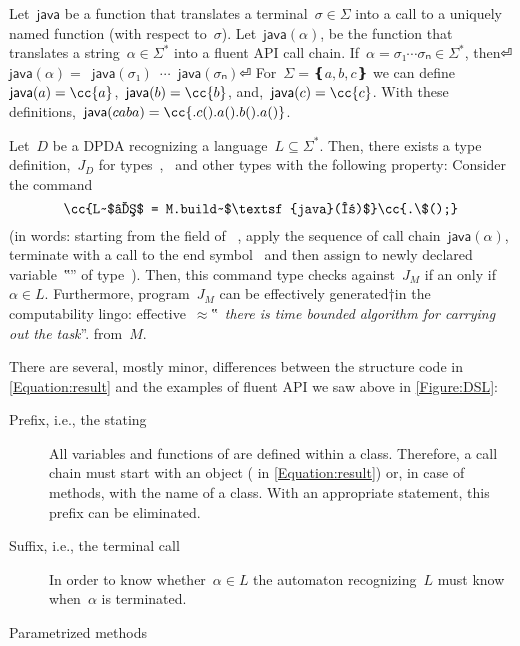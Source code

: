 Let~$\textsf{java}$ be a function that translates a terminal~$σ∈Σ$
into a call to a uniquely named function (with respect to~$σ$).
Let~$\textsf{java}(α)$, be the function
  that translates a string~$α∈Σ^*$ into a fluent API call chain.
If~$α=σ₁⋯σₙ∈Σ^*$, then⏎
  \mbox{\qquad\qquad}$\textsf{java}(α)=$~$\textsf{java}(σ₁)$~$⋯$~$\textsf{java}(σₙ)$\cc{()}⏎
For~$Σ=❴a,b,c❵$ we can define~$\textsf{java}(a)=\cc{a}$,~$\textsf{java}(b)=\cc{b}$, and,~$\textsf{java}(c)=\cc{c}$.
With these definitions,~$\textsf{java}(caba) = \cc{.c().a().b().a()}$.

\begin{theorem}\label{Theorem:Gil-Levy}
  Let~$D$ be a DPDA recognizing a language~$L⊆Σ^*$.
  Then, there exists a \Java type definition,~$J_D$ for types~,~ and other types with the following
  property: Consider the \Java command
  \begin{equation}
    \label{Equation:result}
    \cc{L~$ℓ$ = M.build~$\textsf{java}(α)$}\cc{.\$();}
  \end{equation}
  (in words: starting from the  field of ~,
  apply the sequence of call chain~$\textsf{java}(α)$, terminate with a call to the
  end symbol~\cc{\$()} and then assign to newly declared variable~‟\cc{\_}” of type~).
  Then, this command type checks against~$J_M$ if an only if~$α∈L$.
  Furthermore, program~$J_M$ can be effectively generated†{in the computability lingo:
    effective~$≈$‟~\emph{there is time
  bounded algorithm for carrying out the task}”.} from~$M$.
\end{theorem}

There are several, mostly minor, differences between the structure \Java code in \cref{Equation:result}
  and the examples of fluent API we saw above in \cref{Figure:DSL}:
\begin{description}
  \item[Prefix, i.e., the stating ]
    All variables and functions of \Java are defined within a class.
    Therefore, a call chain must start with an object ( in \cref{Equation:result})
      or, in case of  methods, with the name of a class.
    With an appropriate  statement, this prefix can be eliminated.
  \item[Suffix, i.e., the terminal  call]
    In order to know whether~$α∈L$ the automaton recognizing~$L$ must
      know when~$α$ is terminated.

  \item[Parametrized methods]
\end{description}
